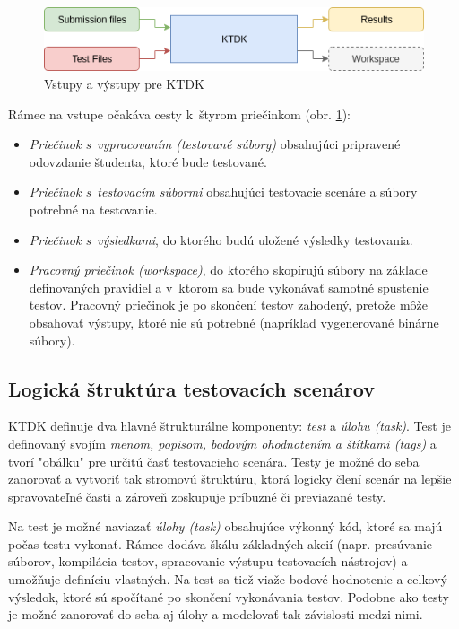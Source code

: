 \documentclass[
  digital, %
  oneside, %
  table,   %
  lof,     %
  lot,   %
]{fithesis3}
\begin{document}
\begin{figure}[!ht]
  \begin{center}
    \includegraphics[width=\textwidth]{imgs/ktdk-io.png}
  \end{center}
    \caption{Vstupy a výstupy pre KTDK}
    \label{fig:ktdk-io}
\end{figure}

Rámec na vstupe očakáva cesty k~štyrom priečinkom (obr. \ref{fig:ktdk-io}):
\begin{itemize}
    \item \emph{Priečinok s~vypracovaním (testované súbory)} obsahujúci pripravené odovzdanie študenta, ktoré bude testované.
    \item \emph{Priečinok s~testovacím súbormi} obsahujúci testovacie scenáre a súbory potrebné na testovanie.
    \item \emph{Priečinok s~výsledkami}, do ktorého budú uložené výsledky testovania.
    \item \emph{Pracovný priečinok (workspace)}, do ktorého skopírujú súbory na základe definovaných pravidiel a v~ktorom sa bude vykonávať samotné spustenie testov. Pracovný priečinok je po skončení testov zahodený, pretože môže obsahovať výstupy, ktoré nie sú potrebné (napríklad vygenerované binárne súbory).
\end{itemize}

\subsection{Logická štruktúra testovacích scenárov}
\label{design-struct-test-scenarios}
KTDK definuje dva hlavné štrukturálne komponenty: \emph{test} a \emph{úlohu (task)}. Test je definovaný svojím \emph{menom, popisom, bodovým ohodnotením a štítkami (\emph{tags})} a tvorí "obálku" pre určitú časť testovacieho scenára. Testy je možné do seba zanorovať a vytvoriť tak stromovú štruktúru, ktorá logicky člení scenár na lepšie spravovateľné časti a zároveň zoskupuje príbuzné či previazané testy. 

Na test je možné naviazať \emph{úlohy (task)} obsahujúce výkonný kód, ktoré sa majú počas testu vykonať. Rámec dodáva škálu základných akcií (napr. presúvanie súborov, kompilácia testov, spracovanie výstupu testovacích nástrojov) a umožňuje definíciu vlastných. Na test sa tiež viaže bodové hodnotenie a celkový výsledok, ktoré sú spočítané po skončení vykonávania testov. Podobne ako testy je možné zanorovať do seba aj úlohy a modelovať tak závislosti medzi nimi.
\end{document}
